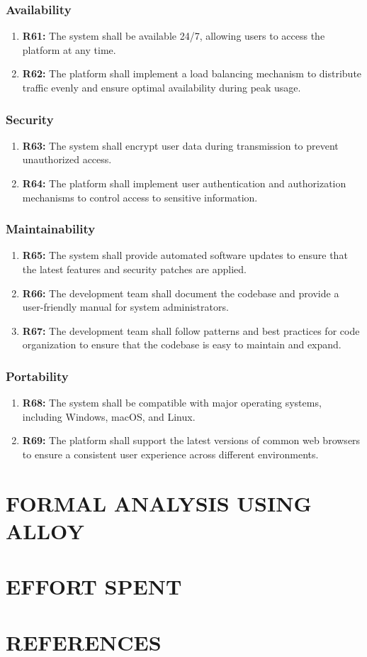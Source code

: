 \documentclass{article}
\begin{document}
\subsubsection{Availability}
\begin{enumerate}
  \item \textbf{R61:} The system shall be available 24/7, allowing users to access the platform at any time.
  \item \textbf{R62:} The platform shall implement a load balancing mechanism to distribute traffic evenly and ensure optimal availability during peak usage.
\end{enumerate}

\subsubsection{Security}
\begin{enumerate}
  \item \textbf{R63:} The system shall encrypt user data during transmission to prevent unauthorized access.
  \item \textbf{R64:} The platform shall implement user authentication and authorization mechanisms to control access to sensitive information.
\end{enumerate}

\subsubsection{Maintainability}
\begin{enumerate}
  \item \textbf{R65:} The system shall provide automated software updates to ensure that the latest features and security patches are applied.
  \item \textbf{R66:} The development team shall document the codebase and provide a user-friendly manual for system administrators.
  \item \textbf{R67:} The development team shall follow patterns and best practices for code organization to ensure that the codebase is easy to maintain and expand.

\end{enumerate}

\subsubsection{Portability}
\begin{enumerate}
  \item \textbf{R68:} The system shall be compatible with major operating systems, including Windows, macOS, and Linux.
  \item \textbf{R69:} The platform shall support the latest versions of common web browsers to ensure a consistent user experience across different environments.
\end{enumerate}

\section{FORMAL ANALYSIS USING ALLOY}

\section{EFFORT SPENT}

\section{REFERENCES}
\end{document}
